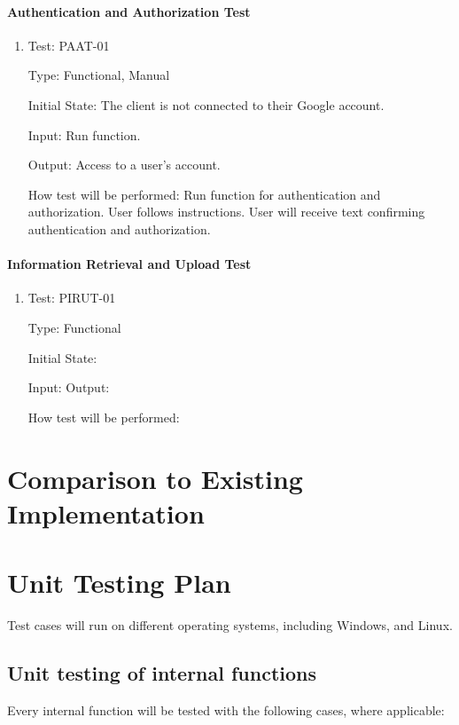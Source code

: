 \documentclass[12pt, titlepage]{article}
\begin{document}
\paragraph{Authentication and Authorization Test}

\begin{enumerate}

\item{Test: PAAT-01\\}

Type: Functional, Manual
					
Initial State: The client is not connected to their Google account. 
					
Input: Run function.
					
Output: Access to a user's account.
					
How test will be performed: Run function for authentication and authorization. 
User follows instructions. 
User will receive text confirming authentication and authorization.
\end{enumerate}

\paragraph{Information Retrieval and Upload Test}
\begin{enumerate}

\item{Test: PIRUT-01\\}

Type: Functional
					
Initial State:
					
Input: 
Output: 
					
How test will be performed:

\end{enumerate}
\section{Comparison to Existing Implementation}	
				
\section{Unit Testing Plan}
Test cases will run on different operating systems, including Windows, and Linux.	
\subsection{Unit testing of internal functions}
Every internal function will be tested with the following cases, where applicable: 
\end{document}
